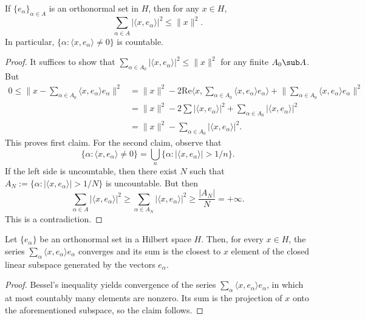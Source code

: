 \begin{proposition}
If $\{e_{\alpha}\}_{\alpha\in A}$ is an orthonormal set in $H$, then for any $x\in H$,
\[\sum_{\alpha\in A}|\langle x,e_{\alpha}\rangle|^2\leq\|x\|^2.\]
In particular, $\{\alpha:\langle x,e_{\alpha}\rangle\neq 0\}$ is countable.
\end{proposition}
\begin{proof}
It suffices to show that $\sum_{\alpha\in A_0}|\langle x,e_{\alpha}\rangle|^2\leq\|x\|^2$ for any finite $A_0\sub A$. But
\begin{align*}
0\leq\Big\|x-\sum_{\alpha\in A_0}\langle x,e_{\alpha}\rangle e_{\alpha}\Big\|^2&=\|x\|^2-2\mathrm{Re}\langle x,\sum_{\alpha\in A_0}\langle x,e_{\alpha}\rangle e_{\alpha}\rangle+\Big\|\sum_{\alpha\in A_0}\langle x,e_{\alpha}\rangle e_{\alpha}\Big\|^2\\
&=\|x\|^2-2\sum|\langle x,e_{\alpha}\rangle|^2+\sum_{\alpha\in A_0}|\langle x,e_{\alpha}\rangle|^2\\
&=\|x\|^2-\sum_{\alpha\in A_0}|\langle x,e_{\alpha}\rangle|^2.
\end{align*}
This proves first claim. For the second claim, observe that
\[\{\alpha:\langle x,e_{\alpha}\rangle\neq 0\}=\bigcup_{n}\{\alpha:|\langle x,e_{\alpha}\rangle|>1/n\}.\]
If the left side is uncountable, then there exist $N$ such that $A_N:=\{\alpha:|\langle x,e_{\alpha}\rangle|>1/N\}$ is uncountable. But then
\[\sum_{\alpha\in A}|\langle x,e_{\alpha}\rangle|^2\geq\sum_{\alpha\in A_N}|\langle x,e_{\alpha}\rangle|^2\geq\frac{|A_N|}{N}=+\infty.\]
This is a contradiction.
\end{proof}
\begin{corollary}
Let $\{e_\alpha\}$ be an orthonormal set in a Hilbert space $H$. Then, for every $x\in H$, the series $\sum_{\alpha}\langle x,e_\alpha\rangle e_\alpha$ converges and its sum is the closest to $x$ element of the closed linear subspace generated by the vectors $e_{\alpha}$.
\end{corollary}
\begin{proof}
Bessel's inequality yields convergence of the series $\sum_{\alpha}\langle x,e_\alpha\rangle e_\alpha$, in which at most countably many elements are nonzero. Its sum is the projection of $x$ onto the aforementioned subspace, so the claim follows.
\end{proof}
